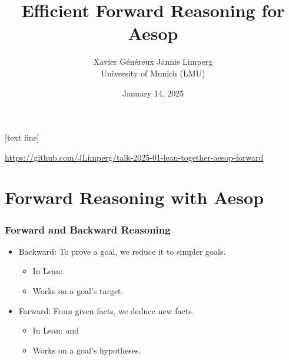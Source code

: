 \title{Efficient Forward Reasoning for Aesop}
\author{Xavier Généreux \qquad Jannis Limperg\\ University of Munich (LMU)}
\date{January 14, 2025}

[text line]{\parbox{\textwidth}{\centering \url{https://github.com/JLimperg/talk-2025-01-lean-together-aesop-forward}\medskip}}

\begin{frame}
  \maketitle
\end{frame}




\section{Forward Reasoning with Aesop}

\begin{frame}
  \frametitle{Forward and Backward Reasoning}

  \begin{itemize}
    \item Backward:
    To prove a goal, we reduce it to simpler goals.
    \begin{itemize}
      \item In Lean: 
      \item Works on a goal's target.
    \end{itemize}

    \item Forward:
    From given facts, we deduce new facts.
    \begin{itemize}
      \item In Lean:  and 
      \item Works on a goal's hypotheses.
    \end{itemize}
  \end{itemize}
\end{frame}

